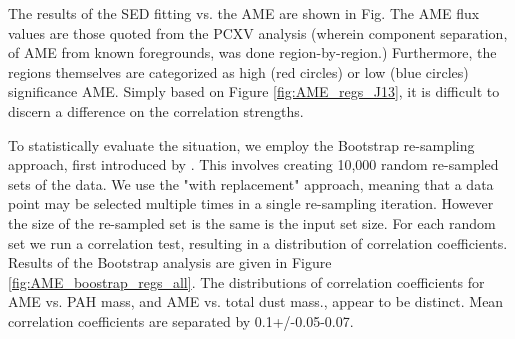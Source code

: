 \documentclass[preprint2,longabstract]{aastex}
\begin{document}

    The results of the SED fitting vs. the AME are shown in Fig. The AME flux values are those quoted from the PCXV analysis (wherein component separation, of AME from known foregrounds, was done region-by-region.) Furthermore, the regions themselves are categorized as high (red circles) or low (blue circles) significance AME. Simply based on Figure \ref{fig:AME_regs_J13}, it is difficult to discern a difference on the correlation strengths.

     To statistically evaluate the situation, we employ the Bootstrap re-sampling approach, first introduced by \cite{efron79}. This involves creating 10,000 random re-sampled sets of the data. We use the "with replacement" approach, meaning that a data point may be selected multiple times in a single re-sampling iteration. However the size of the re-sampled set is the same is the input set size. For each random set we run a correlation test, resulting in a distribution of correlation coefficients. Results of the Bootstrap analysis are given in Figure \ref{fig:AME_boostrap_regs_all}. The distributions of correlation coefficients for AME vs. PAH mass, and AME vs. total dust mass., appear to be distinct. Mean correlation coefficients are separated by 0.1+/-0.05-0.07.

\end{document}
